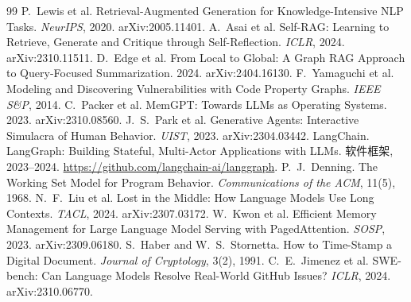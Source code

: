 \documentclass[11pt]{ctexart}
\begin{document}
\begin{thebibliography}{99}
 P.~Lewis et al. Retrieval-Augmented Generation for
Knowledge-Intensive NLP Tasks. \emph{NeurIPS}, 2020. arXiv:2005.11401.
 A.~Asai et al. Self-RAG: Learning to Retrieve, Generate
and Critique through Self-Reflection. \emph{ICLR}, 2024. arXiv:2310.11511.
 D.~Edge et al. From Local to Global: A Graph RAG
Approach to Query-Focused Summarization. 2024. arXiv:2404.16130.
 F.~Yamaguchi et al. Modeling and Discovering
Vulnerabilities with Code Property Graphs. \emph{IEEE S\&P}, 2014.
 C.~Packer et al. MemGPT: Towards LLMs as Operating
Systems. 2023. arXiv:2310.08560.
 J.~S.~Park et al. Generative Agents: Interactive
Simulacra of Human Behavior. \emph{UIST}, 2023. arXiv:2304.03442.
 LangChain. LangGraph: Building Stateful, Multi-Actor
Applications with LLMs. 软件框架, 2023--2024.
\url{https://github.com/langchain-ai/langgraph}.
 P.~J.~Denning. The Working Set Model for Program
Behavior. \emph{Communications of the ACM}, 11(5), 1968.
 N.~F.~Liu et al. Lost in the Middle: How Language Models Use
Long Contexts. \emph{TACL}, 2024. arXiv:2307.03172.
 W.~Kwon et al. Efficient Memory Management for Large
Language Model Serving with PagedAttention. \emph{SOSP}, 2023. arXiv:2309.06180.
 S.~Haber and W.~S.~Stornetta. How to Time-Stamp a
Digital Document. \emph{Journal of Cryptology}, 3(2), 1991.
 C.~E.~Jimenez et al. SWE-bench: Can Language Models
Resolve Real-World GitHub Issues? \emph{ICLR}, 2024. arXiv:2310.06770.
\end{thebibliography}
\end{document}
